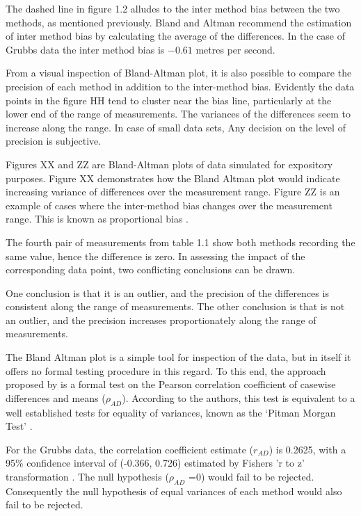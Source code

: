 \documentclass[12pt, a4paper]{report}
\begin{document}
The dashed line in figure 1.2 alludes to the inter method bias
between the two methods, as mentioned previously. Bland and Altman
recommend the estimation of inter method bias by calculating the
average of the differences. In the case of Grubbs data the inter
method bias is $-0.61$ metres per second.


From a visual inspection of Bland-Altman plot, it is also possible
to compare the precision of each method in addition to the
inter-method bias.  Evidently the data points in the figure HH
tend to cluster near the bias line, particularly at the lower end
of the range of measurements. The variances of the differences
seem to increase along the range. In case of small data sets, Any
decision on the level of precision is subjective.

Figures XX and ZZ are Bland-Altman plots of data simulated for
expository purposes. Figure XX demonstrates how the Bland Altman
plot would indicate increasing variance of differences over the
measurement range. Figure ZZ is an example of cases where the
inter-method bias changes over the measurement range. This is
known as proportional bias \citep{ludbrook97}.




The fourth pair of measurements from table 1.1 show both methods
recording the same value, hence the difference is zero. In
assessing the impact of the corresponding data point, two
conflicting conclusions can be drawn.

One conclusion is that it is an outlier, and the precision of the
differences is consistent along the range of measurements. The
other conclusion is that is not an outlier, and the precision
increases proportionately along the range of measurements.

The Bland Altman plot is a simple tool for inspection of the data,
but in itself it offers no formal testing procedure in this
regard. To this end, the approach proposed by \citet{BA83} is a
formal test on the Pearson correlation coefficient  of casewise
differences and means ($\rho_{AD}$). According to the authors,
this test is equivalent to a well established tests for equality
of variances, known as the `Pitman Morgan Test' \citep{Pitman,
Morgan}.

For the Grubbs data, the correlation coefficient estimate
($r_{AD}$) is 0.2625, with a 95\% confidence interval of (-0.366,
0.726) estimated by Fishers 'r to z' transformation \citep{Cohen}.
The null hypothesis ($\rho_{AD}$ =0) would fail to be rejected.
Consequently the null hypothesis of equal variances of each method
would also fail to be rejected.
\end{document}
